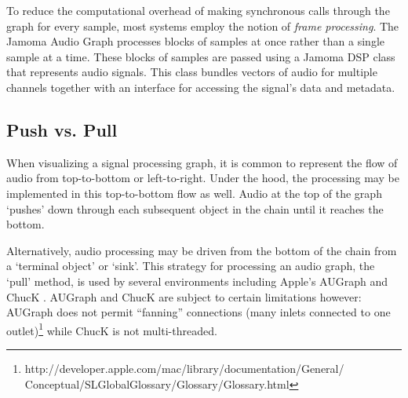 \documentclass[twoside,a4paper]{article}
\begin{document}

To reduce the computational overhead of making synchronous calls through the graph for every sample, most systems employ the notion of \emph{frame processing}.  
The Jamoma Audio Graph processes blocks of samples at once rather than a single sample at a time.  
These blocks of samples are passed using a Jamoma DSP class that represents audio signals.  This class bundles vectors of audio for multiple channels together with an interface for accessing the signal's data and metadata.



\subsection{Push vs. Pull} \label{sec:pull} %

When visualizing a signal processing graph, it is common to represent the flow of audio from top-to-bottom or left-to-right.  
Under the hood, the processing may be implemented in this top-to-bottom flow as well.  
Audio at the top of the graph `pushes' down through each subsequent object in the chain until it reaches the bottom.

Alternatively, audio processing may be driven from the bottom of the chain from a `terminal object' or `sink'.  
This strategy for processing an audio graph, the `pull' method, is used by several environments including Apple's AUGraph and ChucK \cite{wang:2008}. 
AUGraph and ChucK are subject to certain limitations however: AUGraph does not permit ``fanning'' connections (many inlets connected to one outlet)\footnote{http://developer.apple.com/mac/library/documentation/General/\\Conceptual/SLGlobalGlossary/Glossary/Glossary.html} while ChucK is not multi-threaded.
\end{document}
